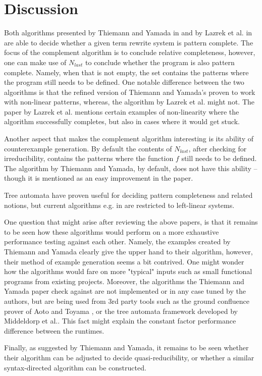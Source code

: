 \section{Discussion} \label{discussion}
Both algorithms presented by Thiemann and Yamada in \cite{thiemann} and by Lazrek et al. in \cite{lazrek} are able to decide whether a given term rewrite system is pattern complete. The focus of the complement algorithm is to conclude relative completeness, however, one can make use of $N_{last}$ to conclude whether the program is also pattern complete. Namely, when that is not empty, the set contains the patterns where the program still needs to be defined. One notable difference between the two algorithms is that the refined version of Thiemann and Yamada's proven to work with non-linear patterns, whereas, the algorithm by Lazrek et al. might not. The paper by Lazrek et al. mentions certain examples of non-linearity where the algorithm successfully completes, but also in cases where it would get stuck.

Another aspect that makes the complement algorithm interesting is its ability of counterexample generation. By default the contents of $N_{last}$, after checking for irreducibility, contains the patterns where the function $f$ still needs to be defined\cite{lazrek}. The algorithm by Thiemann and Yamada, by default, does not have this ability – though it is mentioned as an easy improvement in the paper\cite{thiemann}.

Tree automata have proven useful for deciding pattern completeness and related notions, but current algorithms e.g. in \cite{middeldorp} are restricted to left-linear systems.

One question that might arise after reviewing the above papers, is that it remains to be seen how these algorithms would perform on a more exhaustive performance testing against each other. Namely, the examples created by Thiemann and Yamada clearly give the upper hand to their algorithm\cite{thiemann}, however, their method of example generation seems a bit contrived. One might wonder how the algorithms would fare on more "typical" inputs such as small functional programs from existing projects. Moreover, the algorithms the Thiemann and Yamada paper check against are not implemented or in any case tuned by the authors, but are being used from 3rd party tools such as the ground confluence prover of Aoto and Toyama \cite{aoto}, or the tree automata framework developed by Middeldorp et al.\cite{middeldorp}. This fact might explain the constant factor performance difference between the runtimes.

Finally, as suggested by Thiemann and Yamada, it remains to be seen whether their algorithm can be adjusted to decide quasi-reducibility, or whether a similar syntax-directed algorithm can be constructed.